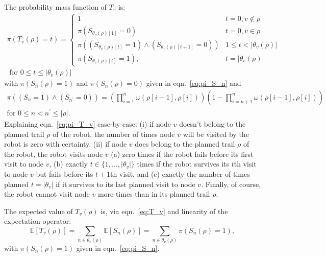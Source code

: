 \documentclass[11pt, oneside]{article}
\begin{document}
The probability mass function of $T_v$ is:
\begin{multline}
	\pi(T_v(\rho) = t ) = 
	\begin{cases}
		1 & t = 0, v \notin \rho \\
		 \pi\left(S_{\theta_v(\rho)[1]}=0\right)& t = 0, v \in \rho \\
		\pi\left( (S_{\theta_v(\rho)[t]}=1) \land (S_{\theta_v(\rho)[t+1]}=0)\right)    & 1 \leq t < \lvert \theta_v(\rho ) \rvert \\
		\pi\left( S_{\theta_v(\rho)[t]}=1 \right), & t = \lvert \theta_v(\rho ) \rvert  
	\end{cases}
	 \\ \text{ for } 0 \leq t \leq \lvert \theta_v(\rho) \rvert \label{eq:pi_T_v}
\end{multline}
with $\pi(S_n(\rho)=1)$ and $\pi(S_n(\rho)=0)$ given in eqn.~\ref{eq:pi_S_n} and
\begin{multline}
	\pi\left( (S_n=1) \land (S_{n^\prime}=0)\right) =	\left( \prod_{i=1}^n \omega(\rho[i-1], \rho[i]) \right)	\left(1-\prod_{i=n+1}^{n^\prime} \omega(\rho[i-1], \rho[i]) \right) \\
	\text{for } 0 \leq n < n^\prime \leq \lvert \rho\rvert.
\end{multline}
Explaining eqn.~\ref{eq:pi_T_v} case-by-case: 
(i) if node $v$ doesn't belong to the planned trail $\rho$ of the robot, the number of times node $v$ will be visited by the robot is zero with certainty.
(ii) if node $v$ does belong to the planned trail $\rho$ of the robot, the robot visits node $v$
(a) zero times if the robot fails before its first visit to node $v$,
(b) exactly $t \in \{1, ..., \lvert \theta_v \rvert\}$ times if the robot survives its $t$th visit to node $v$ but fails before its $t+1$th visit, and
(c) exactly the number of times planned $t=\lvert \theta_v \rvert$ if it survives to its last planned visit to node $v$.
Finally, of course, the robot cannot visit node $v$ more times than in its planned trail $\rho$.

The expected value of $T_v(\rho)$ is, via eqn.~\ref{eq:T_v} and linearity of the expectation operator:
\begin{equation}
	\mathbb{E}[T_v(\rho)] = \sum_{n \in \theta_v(\rho) } \mathbb{E}[S_n(\rho)] = \sum_{n \in \theta_v(\rho) } \pi(S_n(\rho)=1), %
	\label{eq:E_T_v}
\end{equation}
with $\pi(S_n(\rho)=1)$ given in eqn.~\ref{eq:pi_S_n}.
\end{document}
